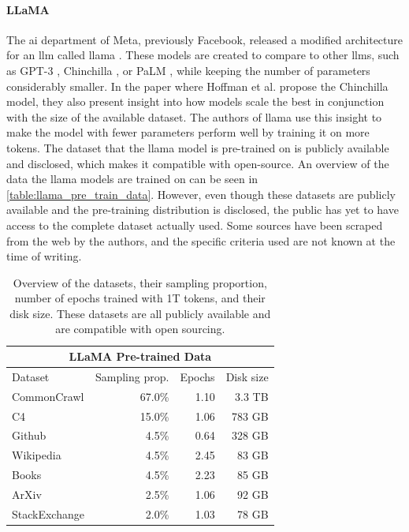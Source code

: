     \paragraph{LLaMA\\}
    The \gls{ai} department of Meta, previously Facebook, released a modified architecture for an \gls{llm} called \gls{llama} \cite{touvronLLaMAOpenEfficient2023}.
    These models are created to compare to other \glspl{llm}, such as GPT-3 \cite{brownLanguageModelsAre2020}, Chinchilla \cite{hoffmannTrainingComputeOptimalLarge2022}, or PaLM \cite{chowdheryPaLMScalingLanguage2022}, while keeping the number of parameters considerably smaller. In the paper where Hoffman et al. propose the Chinchilla model, they also present insight into how models scale the best in conjunction with the size of the available dataset. The authors of \gls{llama} use this insight to make the model with fewer parameters perform well by training it on more tokens. The dataset that the \gls{llama} model is pre-trained on is publicly available and disclosed, which makes it compatible with open-source. An overview of the data the \gls{llama} models are trained on can be seen in \autoref{table:llama_pre_train_data}. However, even though these datasets are publicly available and the pre-training distribution is disclosed, the public has yet to have access to the complete dataset actually used. Some sources have been scraped from the web by the authors, and the specific criteria used are not known at the time of writing.


    \begin{table}[htb]
    \centering
    \begin{tabular}{ l r r r } 
        
            \multicolumn{4}{c}{\textbf{LLaMA Pre-trained Data}}\\ [0.5ex] 
           \toprule
           Dataset & Sampling prop. & Epochs & Disk size \\
        \midrule
            CommonCrawl & 67.0\% & 1.10 & 3.3 TB \\
            C4 & 15.0\% & 1.06 & 783 GB\\
            Github & 4.5\% & 0.64 & 328 GB\\
            Wikipedia & 4.5\% & 2.45 & 83 GB\\
            Books & 4.5\% & 2.23 & 85 GB\\
            ArXiv & 2.5\% & 1.06 & 92 GB \\
            StackExchange & 2.0\% & 1.03 & 78 GB\\[0.5ex]
        \bottomrule
    \end{tabular}
    \caption[Overview of datasets used for LLaMA pretraining.]{Overview of the datasets, their sampling proportion, number of epochs trained with 1T tokens, and their disk size. These datasets are all publicly available and are compatible with open sourcing.}
    \label{table:llama_pre_train_data}
    \end{table}
    
